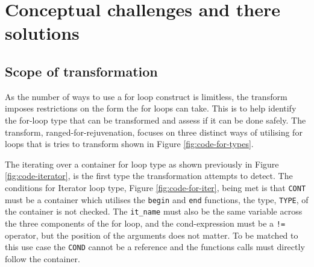 \documentclass[bsc,frontabs,singlespacing,twoside,parskip,deptreport]{infthesis}
\begin{document}


\section{Conceptual challenges and there solutions}\label{sec:for-concept}
\subsection{Scope of transformation}\label{sec:forLoop-scope-trans}
As the number of ways to use a for loop construct is limitless, the transform imposes restrictions on the form the for loops can take. This is to help identify the for-loop type that can be transformed and assess if it can be done safely. The transform, ranged-for-rejuvenation, focuses on three distinct ways of utilising for loops that is tries to transform shown in Figure \ref{fig:code-for-types}. 

The iterating over a container for loop type as shown previously in Figure \ref{fig:code-iterator}, is the first type the transformation attempts to detect.
The conditions for Iterator loop type, Figure \ref{fig:code-for-iter}, being met is that \texttt{CONT} must be a container which utilises the \texttt{begin} and \texttt{end} functions, the type, \texttt{TYPE}, of the container is not checked. The \texttt{it\_name} must also be the same variable across the three components of the for loop, and the cond-expression must be a \texttt{!=} operator, but the position of the arguments does not matter. To be matched to this use case the \texttt{COND} cannot be a reference and the functions calls must directly follow the container. 
\end{document}
